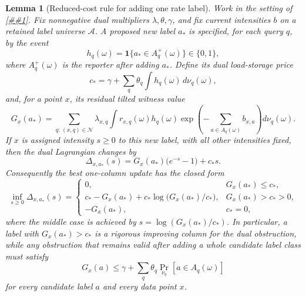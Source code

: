 \documentclass[10pt]{article}
\newcommand{\cref}[1]{\ref{##1}}
\newtheorem{lemma}[theorem]{Lemma}
\theoremstyle{definition}
\begin{document}
\begin{lemma}[Reduced-cost rule for adding one rate label]
   \label{lem:rate-coverage-column-gain}
   Work in the setting of \cref{lem:finite-rate-coverage-convex}.  Fix
   nonnegative dual multipliers \(\lambda,\theta,\gamma\), and fix current
   intensities \(b\) on a retained label universe \(\mathcal A\).  A proposed
   new label \(a_*\) is specified, for each query \(q\), by the event
   \[
      h_q(\omega)=\mathbf 1\{a_*\in A_q^+(\omega)\}\in\{0,1\},
   \]
   where \(A_q^+(\omega)\) is the reporter after adding \(a_*\).  Define its
   dual load-storage price
   \[
      c_*=
      \gamma+\sum_q\theta_q\int h_q(\omega)\,d\nu_q(\omega),
      \tag{CG0}
   \]
   and, for a point \(x\), its residual tilted witness value
   \[
      G_x(a_*)
      =
      \sum_{q:\,(x,q)\in\mathcal N}
      \lambda_{x,q}
      \int
      r_{x,q}(\omega)h_q(\omega)
      \exp\!\left(
         -\sum_{a\in A_q(\omega)}b_{x,a}
      \right)d\nu_q(\omega).
      \tag{CG1}
   \]
   If \(x\) is assigned intensity \(s\ge0\) to this new label, with all other
   intensities fixed, then the dual Lagrangian changes by
   \[
      \Delta_{x,a_*}(s)
      =
      G_x(a_*)\bigl(e^{-s}-1\bigr)+c_*s .
      \tag{CG2}
   \]
   Consequently the best one-column update has the closed form
   \[
      \inf_{s\ge0}\Delta_{x,a_*}(s)
      =
      \begin{cases}
      0, & G_x(a_*)\le c_*,\\[2mm]
      c_*-G_x(a_*)+c_*\log\!\bigl(G_x(a_*)/c_*\bigr),
         & G_x(a_*)>c_*>0,\\[2mm]
      -G_x(a_*), & c_*=0,
      \end{cases}
      \tag{CG3}
   \]
   where the middle case is achieved by
   \(s=\log(G_x(a_*)/c_*)\).  In particular, a label with
   \(G_x(a_*)>c_*\) is a rigorous improving column for the dual obstruction,
   while any obstruction that remains valid after adding a whole candidate label
   class must satisfy
   \[
      G_x(a)\le
      \gamma+\sum_q\theta_q\Pr_{\nu_q}[a\in A_q(\omega)]
      \tag{CG4}
   \]
   for every candidate label \(a\) and every data point \(x\).
\end{lemma}
\end{document}
